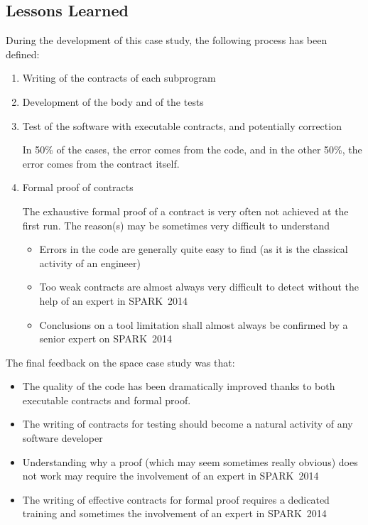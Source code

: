\documentclass[10pt,a4paper,twocolumn]{article}
\newcommand{\newspark}{SPARK~2014\xspace}
\begin{document}
\subsection{Lessons Learned}

During the development of this case study, the following process has been defined:

\begin{enumerate}
\item Writing of the contracts of each subprogram
\item Development of the body and of the tests
\item Test of the software with executable contracts, and potentially correction

			In 50\% of the cases, the error comes from the code, and in the other
			50\%, the error comes from the contract itself.
\item Formal proof of contracts

			The exhaustive formal proof of a contract is very often not achieved at the first run.
			The reason(s) may be sometimes very difficult to understand
			\begin{itemize}
			\item Errors in the code are generally quite easy to find (as it is
						the classical activity of an engineer)
			\item Too weak contracts are almost always very difficult to detect without
						the help of an expert in \newspark
			\item Conclusions on a tool limitation shall almost always be confirmed by
						a senior expert on \newspark
			\end{itemize}
\end{enumerate}

The final feedback on the space case study was that:
\begin{itemize}
\item The quality of the code has been dramatically improved thanks to both executable contracts and formal proof.
\item The writing of contracts for testing should become a natural activity of any software developer
\item Understanding why a proof (which may seem sometimes really obvious) does not work may require the involvement of an expert in \newspark
\item The writing of effective contracts for formal proof requires a dedicated training and sometimes the involvement of an expert in \newspark
\end{itemize}
\end{document}
